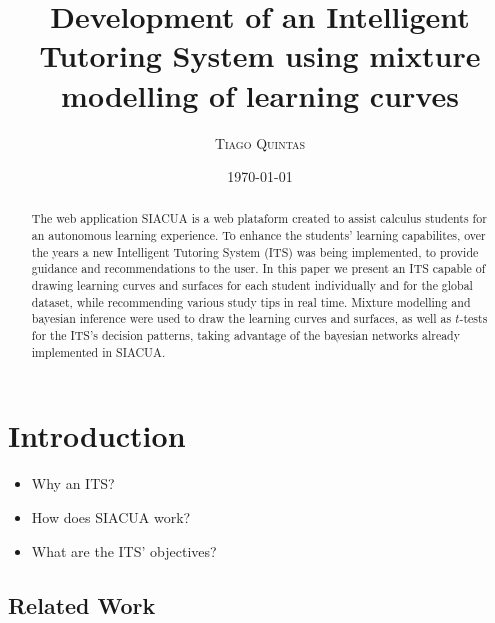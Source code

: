 \documentclass{article}
\title{
\textbf{\huge{Development of an Intelligent Tutoring System using mixture modelling of learning curves}}
}
\author{\Large{\textsc{Tiago Quintas}}}
\date{\today}
\newcommand{\0}{\mathbbold{0}}
\newcommand{\1}{\mathds{1}}
\begin{document}
\maketitle
\begin{abstract}
    The web application SIACUA is a web plataform created to assist calculus students for an autonomous learning experience.
    To enhance the students' learning capabilites, over the years a new Intelligent Tutoring System (ITS) was being implemented, to provide guidance and recommendations to the user.
    In this paper we present an ITS capable of drawing learning curves and surfaces for each student individually and for the global dataset, while recommending various study tips in real time.
    Mixture modelling and bayesian inference were used to draw the learning curves and surfaces, as well as $t$-tests for the ITS's decision patterns, taking advantage of the bayesian networks already implemented in SIACUA.
\end{abstract}
\section{Introduction}
\begin{itemize}
    \item Why an ITS?
    \item How does SIACUA work?
    \item What are the ITS' objectives?
\end{itemize}
\lipsum[1-3]
\subsection{Related Work}
\lipsum[4-6]
\end{document}
